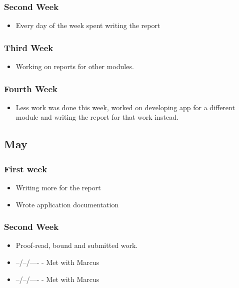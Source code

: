 \subsubsection{Second Week}\label{second-week-6}

\begin{itemize}
\tightlist
\item
  Every day of the week spent writing the report
\end{itemize}

\subsubsection{Third Week}\label{third-week-5}

\begin{itemize}
\tightlist
\item
  Working on reports for other modules.
\end{itemize}

\subsubsection{Fourth Week}\label{fourth-week-5}

\begin{itemize}
\tightlist
\item
  Less work was done this week, worked on developing app for a different
  module and writing the report for that work instead.
\end{itemize}

\subsection{May}\label{may}

\subsubsection{First week}\label{first-week-7}

\begin{itemize}
\tightlist
\item
  Writing more for the report
\item
  Wrote application documentation
\end{itemize}

\subsubsection{Second Week}\label{second-week-7}

\begin{itemize}
\item
  Proof-read, bound and submitted work.
\item
  --/--/---- - Met with Marcus
\item
  --/--/---- - Met with Marcus
\end{itemize}
